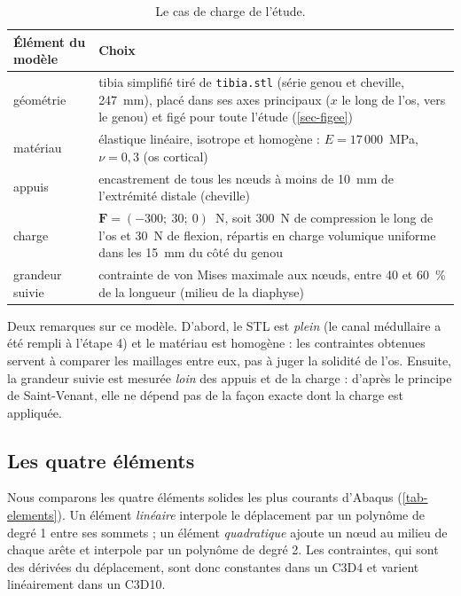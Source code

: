 \documentclass[11pt,a4paper]{article}
\newcommand{\fichier}[1]{\texttt{\small #1}}
\newcommand{\vb}[1]{\mathbf{#1}}
\begin{document}
\begin{table}[h]
\centering\small
\caption{Le cas de charge de l'étude.}
\label{tab-cas}
\begin{tabularx}{\textwidth}{lY}
\toprule
\textbf{Élément du modèle} & \textbf{Choix} \\
\midrule
géométrie & tibia simplifié tiré de \fichier{tibia.stl} (série genou et cheville, 247~mm), placé dans ses axes
principaux ($x$ le long de l'os, vers le genou) et figé pour toute l'étude (\cref{sec-figee}) \\
matériau & élastique linéaire, isotrope et homogène : $E = 17\,000$~MPa, $\nu = 0{,}3$ (os cortical) \\
appuis & encastrement de tous les nœuds à moins de 10~mm de l'extrémité distale (cheville) \\
charge & $\vb{F} = (-300 ;\ 30 ;\ 0)$~N, soit 300~N de compression le long de l'os et 30~N de flexion,
répartis en charge volumique uniforme dans les 15~mm du côté du genou \\
grandeur suivie & contrainte de von Mises maximale aux nœuds, entre 40 et 60~\% de la longueur (milieu de la
diaphyse) \\
\bottomrule
\end{tabularx}
\end{table}

Deux remarques sur ce modèle. D'abord, le STL est \emph{plein} (le canal médullaire a été rempli à l'étape 4) et le
matériau est homogène : les contraintes obtenues servent à comparer les maillages entre eux, pas à juger la solidité
de l'os. Ensuite, la grandeur suivie est mesurée \emph{loin} des appuis et de la charge : d'après le principe de
Saint-Venant, elle ne dépend pas de la façon exacte dont la charge est appliquée.

\subsection{Les quatre éléments}

Nous comparons les quatre éléments solides les plus courants d'Abaqus (\cref{tab-elements}). Un élément
\emph{linéaire} interpole le déplacement par un polynôme de degré 1 entre ses sommets ; un élément \emph{quadratique}
ajoute un nœud au milieu de chaque arête et interpole par un polynôme de degré 2. Les contraintes, qui sont des
dérivées du déplacement, sont donc constantes dans un C3D4 et varient linéairement dans un C3D10.
\end{document}
